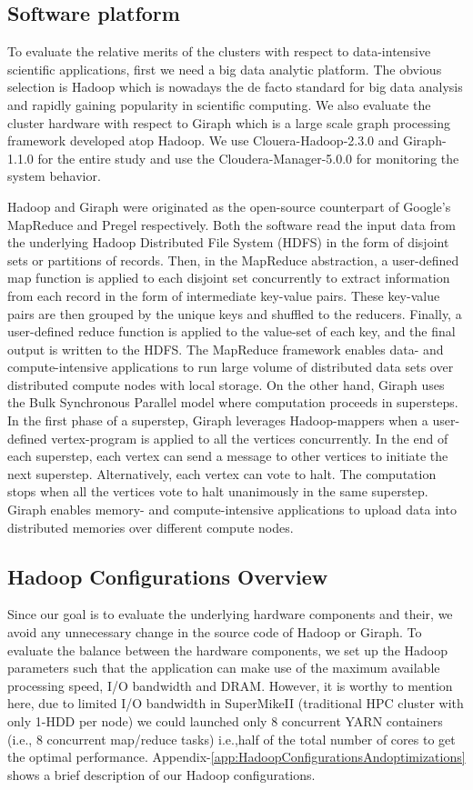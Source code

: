 \documentclass[journal]{IEEEtran}
\begin{document}
\subsection{Software platform}
To evaluate the relative merits of the clusters with respect to data-intensive scientific applications, first we need a big data analytic platform. The obvious selection is Hadoop which is nowadays the de facto standard for big data analysis and rapidly gaining popularity in scientific computing. We also evaluate the cluster hardware with respect to Giraph which is a large scale graph processing framework developed atop Hadoop. We use Clouera-Hadoop-2.3.0 and Giraph-1.1.0 for the entire study and use the Cloudera-Manager-5.0.0 for monitoring the system behavior. 

Hadoop and Giraph were originated as the open-source counterpart of Google's MapReduce \cite{fw:mapreduce} and Pregel \cite{fw:pregel} respectively. Both the software read the input data from the underlying Hadoop Distributed File System (HDFS) in the form of disjoint sets or partitions of records. Then, in the MapReduce abstraction, a user-defined map function is applied to each disjoint set concurrently to extract information from each record in the form of intermediate key-value pairs. These key-value pairs are then grouped by the unique keys and shuffled to the reducers. Finally, a user-defined reduce function is applied to the value-set of each key, and the final output is written to the HDFS. The MapReduce framework enables data- and compute-intensive applications to run large volume of distributed data sets over distributed compute nodes with local storage. On the other hand, Giraph uses the Bulk Synchronous Parallel model \cite{fw:bsp} where computation proceeds in supersteps. In the first phase of a superstep, Giraph leverages Hadoop-mappers when a user-defined vertex-program is applied to all the vertices concurrently. In the end of each superstep, each vertex can send a message to other vertices to initiate the next superstep. Alternatively, each vertex can vote to halt. The computation stops when all the vertices vote to halt unanimously in the same superstep. Giraph enables memory- and compute-intensive applications to upload data into distributed memories over different compute nodes.

\subsection{Hadoop Configurations Overview}
Since our goal is to evaluate the underlying hardware components and their, we avoid any unnecessary change in the source code of Hadoop or Giraph. To evaluate the balance between the hardware components, we set up the Hadoop parameters such that the application can make use of the maximum available processing speed, I/O bandwidth and DRAM. However, it is worthy to mention here, due to limited I/O bandwidth in SuperMikeII (traditional HPC cluster with only 1-HDD per node) we could launched only 8 concurrent YARN containers (i.e., 8 concurrent map/reduce tasks) i.e.,half of the total number of cores to get the optimal performance. Appendix-\ref{app:HadoopConfigurationsAndoptimizations} shows a brief description of our Hadoop configurations.
\end{document}
